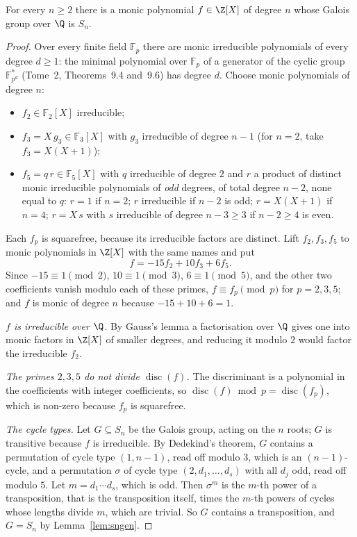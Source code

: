 \begin{theorem}\label{thm:sn}
For every $n\ge2$ there is a monic polynomial $f\in\Z[X]$ of degree $n$ whose Galois group over $\Q$ is $S_n$.
\end{theorem}
\begin{proof}
Over every finite field $\mathbb F_p$ there are monic irreducible polynomials of every degree $d\ge1$: the minimal polynomial over $\mathbb F_p$ of a generator
of the cyclic group $\mathbb F_{p^d}^*$ (Tome~2, Theorems~9.4 and~9.6) has degree $d$. Choose monic polynomials of degree $n$:
\begin{itemize}
\item $f_2\in\mathbb F_2[X]$ irreducible;
\item $f_3=X\,g_3\in\mathbb F_3[X]$ with $g_3$ irreducible of degree $n-1$ (for $n=2$, take $f_3=X(X+1)$);
\item $f_5=q\,r\in\mathbb F_5[X]$ with $q$ irreducible of degree $2$ and $r$ a product of distinct monic irreducible polynomials of \emph{odd} degrees, of
total degree $n-2$, none equal to $q$: $r=1$ if $n=2$; $r$ irreducible if $n-2$ is odd; $r=X(X+1)$ if $n=4$; $r=X\,s$ with $s$ irreducible of degree
$n-3\ge3$ if $n-2\ge4$ is even.
\end{itemize}
Each $f_p$ is squarefree, because its irreducible factors are distinct. Lift $f_2,f_3,f_5$ to monic polynomials in $\Z[X]$ with the same names and put
\[
f=-15f_2+10f_3+6f_5.
\]
Since $-15\equiv1\pmod2$, $10\equiv1\pmod3$, $6\equiv1\pmod5$, and the other two coefficients vanish modulo each of these primes, $f\equiv f_p\pmod p$ for
$p=2,3,5$; and $f$ is monic of degree $n$ because $-15+10+6=1$.

\emph{$f$ is irreducible over $\Q$.} By Gauss's lemma a factorisation over $\Q$ gives one into monic factors in $\Z[X]$ of smaller degrees, and reducing it
modulo $2$ would factor the irreducible $f_2$.

\emph{The primes $2,3,5$ do not divide $\operatorname{disc}(f)$.} The discriminant is a polynomial in the coefficients with integer coefficients, so
$\operatorname{disc}(f)\bmod p=\operatorname{disc}(f_p)$, which is non-zero because $f_p$ is squarefree.

\emph{The cycle types.} Let $G\subseteq S_n$ be the Galois group, acting on the $n$ roots; $G$ is transitive because $f$ is irreducible. By Dedekind's
theorem, $G$ contains a permutation of cycle type $(1,n-1)$, read off modulo $3$, which is an $(n-1)$-cycle, and a permutation $\sigma$ of cycle type
$(2,d_1,\dots,d_s)$ with all $d_j$ odd, read off modulo $5$. Let $m=d_1\cdots d_s$, which is odd. Then $\sigma^m$ is the $m$-th power of a
transposition, that is the transposition itself, times the $m$-th powers of cycles whose lengths divide $m$, which are trivial. So $G$ contains a
transposition, and $G=S_n$ by Lemma~\ref{lem:sngen}.
\end{proof}

